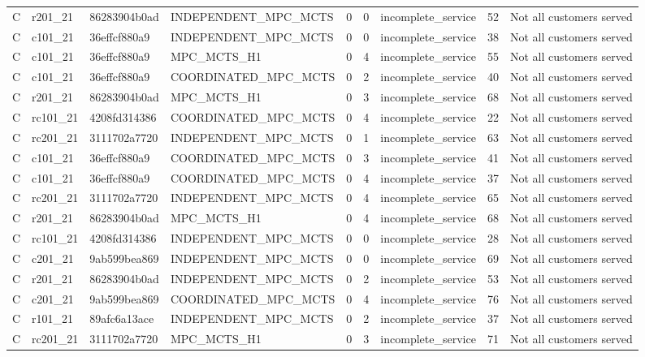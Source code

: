 \begin{table}
{\begin{tabular}{llllrrlrl}
C & r201\_21 & 86283904b0ad & INDEPENDENT\_MPC\_MCTS & 0 & 0 & incomplete\_service & 52 & Not all customers served \\
C & c101\_21 & 36effcf880a9 & INDEPENDENT\_MPC\_MCTS & 0 & 0 & incomplete\_service & 38 & Not all customers served \\
C & c101\_21 & 36effcf880a9 & MPC\_MCTS\_H1 & 0 & 4 & incomplete\_service & 55 & Not all customers served \\
C & c101\_21 & 36effcf880a9 & COORDINATED\_MPC\_MCTS & 0 & 2 & incomplete\_service & 40 & Not all customers served \\
C & r201\_21 & 86283904b0ad & MPC\_MCTS\_H1 & 0 & 3 & incomplete\_service & 68 & Not all customers served \\
C & rc101\_21 & 4208fd314386 & COORDINATED\_MPC\_MCTS & 0 & 4 & incomplete\_service & 22 & Not all customers served \\
C & rc201\_21 & 3111702a7720 & INDEPENDENT\_MPC\_MCTS & 0 & 1 & incomplete\_service & 63 & Not all customers served \\
C & c101\_21 & 36effcf880a9 & COORDINATED\_MPC\_MCTS & 0 & 3 & incomplete\_service & 41 & Not all customers served \\
C & c101\_21 & 36effcf880a9 & COORDINATED\_MPC\_MCTS & 0 & 4 & incomplete\_service & 37 & Not all customers served \\
C & rc201\_21 & 3111702a7720 & INDEPENDENT\_MPC\_MCTS & 0 & 4 & incomplete\_service & 65 & Not all customers served \\
C & r201\_21 & 86283904b0ad & MPC\_MCTS\_H1 & 0 & 4 & incomplete\_service & 68 & Not all customers served \\
C & rc101\_21 & 4208fd314386 & INDEPENDENT\_MPC\_MCTS & 0 & 0 & incomplete\_service & 28 & Not all customers served \\
C & c201\_21 & 9ab599bea869 & INDEPENDENT\_MPC\_MCTS & 0 & 0 & incomplete\_service & 69 & Not all customers served \\
C & r201\_21 & 86283904b0ad & INDEPENDENT\_MPC\_MCTS & 0 & 2 & incomplete\_service & 53 & Not all customers served \\
C & c201\_21 & 9ab599bea869 & COORDINATED\_MPC\_MCTS & 0 & 4 & incomplete\_service & 76 & Not all customers served \\
C & r101\_21 & 89afc6a13ace & INDEPENDENT\_MPC\_MCTS & 0 & 2 & incomplete\_service & 37 & Not all customers served \\
C & rc201\_21 & 3111702a7720 & MPC\_MCTS\_H1 & 0 & 3 & incomplete\_service & 71 & Not all customers served \\

\end{tabular}}
\end{table}
